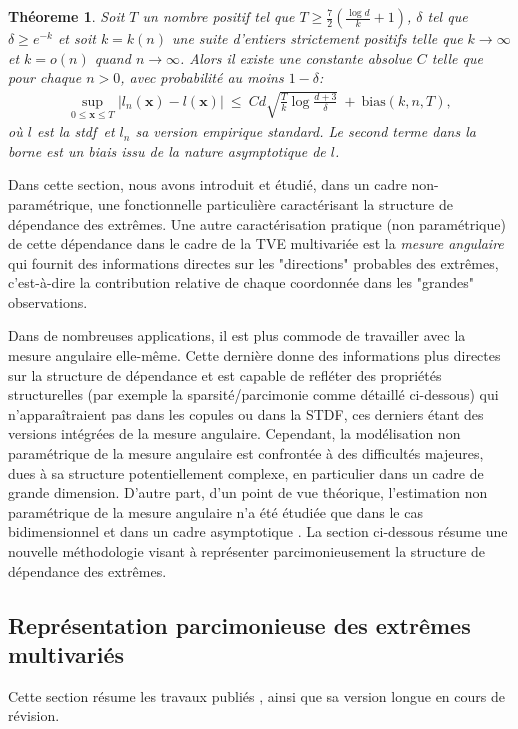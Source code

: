 \documentclass[a4paper, 12pt]{article}
\newtheorem{theoreme}{Théoreme}
\def\stdf{{\sc stdf}}
\begin{document}
\begin{theoreme}
\label{resume_fr:thm:l}
Soit $T$ un nombre positif tel que $T \ge \frac{7}{2}(\frac{\log d}{k} + 1)$, $\delta$ tel que $\delta \ge e^{-k}$ et soit $k=k(n)$ une suite d'entiers strictement positifs telle que $k \to \infty$ et $k=o(n)$ quand $n \to \infty$. 
Alors il existe une constante absolue $ C $ telle que pour chaque $ n> 0 $, avec probabilité au moins $ 1- \delta $:
\begin{align*}
\sup_{0 \le \mathbf{x} \le T} \left| l_n(\mathbf{x}) - l(\mathbf{x}) \right| ~\le~ Cd\sqrt{\frac{T}{k}\log\frac{d+3}{\delta}} ~+~
\text{bias}(k, n, T),
\end{align*}
où $ l $ est la \stdf~et $ l_n $ sa version empirique standard. Le second terme dans la borne est un biais issu de la nature asymptotique de $ l $.
\end{theoreme}


Dans cette section, nous avons introduit et étudié, dans un cadre non-paramétrique, une fonctionnelle particulière caractérisant la structure de dépendance des extrêmes.
%
Une autre caractérisation pratique (non paramétrique) de cette dépendance dans le cadre de la TVE multivariée est la \textit{mesure angulaire} qui fournit des informations directes sur les "directions" probables des extrêmes, c'est-à-dire la contribution relative de chaque coordonnée dans les "grandes" observations.

Dans de nombreuses applications, il est plus commode de travailler avec la mesure angulaire elle-même. Cette dernière donne des informations plus directes sur la structure de dépendance et est capable de refléter des propriétés structurelles (par exemple la sparsité/parcimonie comme détaillé ci-dessous) qui n'apparaîtraient pas dans les copules ou dans la STDF, ces derniers étant des versions intégrées de la mesure angulaire.
Cependant, la modélisation non paramétrique de la mesure angulaire est confrontée à des difficultés majeures, dues à sa structure potentiellement complexe, en particulier dans un cadre de grande dimension.
D'autre part, d'un point de vue théorique, l'estimation non paramétrique de la mesure angulaire n'a été étudiée que dans le cas bidimensionnel et dans un cadre asymptotique \cite{Einmahl2001, Einmahl2009}. La section ci-dessous résume une nouvelle méthodologie visant à représenter parcimonieusement la structure de dépendance des extrêmes.


\subsection{Représentation parcimonieuse des extrêmes multivariés}
\label{resume_fr:sec:JMVA}
Cette section résume les travaux publiés \cite{AISTAT16}, ainsi que sa version longue \cite{ARXIV16} en cours de révision.
\end{document}
